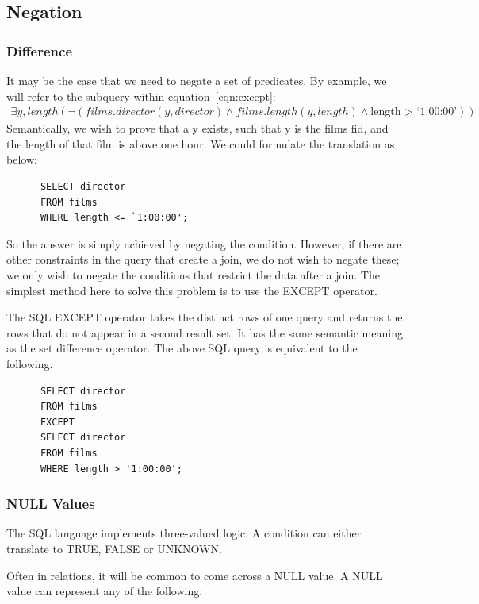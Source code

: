 \documentclass[a4paper, 11pt]{article}
\begin{document}
  \subsection{Negation}
    \subsubsection{Difference}
      \label{sec:except}
      It may be the case that we need to negate a set of predicates. By example,
      we will refer to the subquery within
      equation~\ref{eqn:except}:
      \begin{multline}
        \exists y,length(\lnot(films.director(y, director) \land films.length(y,
        length) \land \text{length > `1:00:00'}))
      \end{multline}
      Semantically, we wish to prove that a y exists, such that y is the films
      fid, and the length of that film is above one hour. We could formulate the
      translation as below:
      \begin{verbatim}
      SELECT director
      FROM films
      WHERE length <= `1:00:00';
      \end{verbatim}
      So the answer is simply achieved by negating the condition. However, if
      there are other constraints in the query that create a join, we do not wish
      to negate these; we only wish to negate the conditions that restrict the
      data after a join. The simplest method here to solve this problem is to use
      the EXCEPT operator.

      The SQL EXCEPT operator takes the distinct rows of one query and returns
      the rows that do not appear in a second result set\cite{wiki:EXCEPT}. It
      has the same semantic meaning as the set difference operator. The
      above SQL query is equivalent to the following.
      \begin{verbatim}
      SELECT director
      FROM films
      EXCEPT
      SELECT director
      FROM films
      WHERE length > '1:00:00';
      \end{verbatim}
    \subsubsection{NULL Values}
      The SQL language implements three-valued logic. A condition can either
      translate to TRUE, FALSE or UNKNOWN.

      Often in relations, it will be common to come across a NULL value. A NULL
      value can represent any of the following\cite{pmbNULL}:
\end{document}
